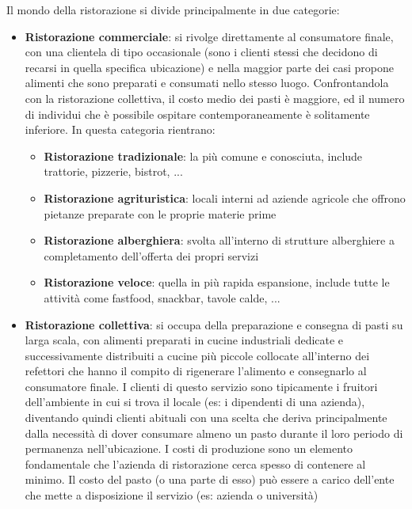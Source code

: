 \documentclass[a4paper, titlepage, 12pt, openright, twoside]{book}
\begin{document}
Il mondo della ristorazione si divide principalmente in due categorie:
\begin{itemize}
	\item \textbf{Ristorazione commerciale}: si rivolge direttamente al consumatore finale, con una clientela di tipo occasionale
											 (sono i clienti stessi che decidono di recarsi in quella specifica ubicazione) e nella maggior parte dei casi
											 propone alimenti che sono preparati e consumati nello stesso luogo. Confrontandola con la ristorazione collettiva,
											 il costo medio dei pasti è maggiore, ed il numero di individui che è possibile ospitare contemporaneamente è solitamente inferiore.
											 In questa categoria rientrano:
											 \begin{itemize}
											 	\item \textbf{Ristorazione tradizionale}: la più comune e conosciuta, include trattorie, pizzerie, bistrot, ...
											 	\item \textbf{Ristorazione agrituristica}: locali interni ad aziende agricole che offrono pietanze preparate con le proprie materie prime
											 	\item \textbf{Ristorazione alberghiera}: svolta all'interno di strutture alberghiere a completamento dell'offerta dei propri servizi
											 	\item \textbf{Ristorazione veloce}: quella in più rapida espansione, include tutte le attività 
											 										come fastfood, snackbar, tavole calde, ...
											 \end{itemize}
	\item \textbf{Ristorazione collettiva}: si occupa della preparazione e consegna di pasti su larga scala, con alimenti preparati in cucine industriali dedicate e
											successivamente distribuiti a cucine più piccole collocate all'interno dei refettori che hanno il compito di rigenerare l'alimento
											e consegnarlo al consumatore finale. I clienti di questo servizio sono tipicamente i fruitori dell'ambiente in cui si trova il locale
											(es: i dipendenti di una azienda), diventando quindi clienti abituali con una scelta che deriva principalmente 
											dalla necessità di dover consumare almeno un pasto durante il loro periodo di permanenza nell'ubicazione. 
											I costi di produzione sono un elemento fondamentale che l'azienda di ristorazione cerca spesso di contenere al minimo.
											Il costo del pasto (o una parte di esso) può essere a carico dell'ente che mette a disposizione il servizio (es: azienda o università)

\end{itemize}
\end{document}
